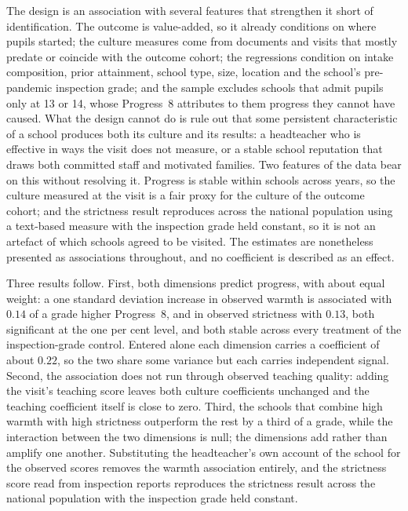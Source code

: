 The design is an association with several features that strengthen it short
of identification. The outcome is value-added, so it already conditions on
where pupils started; the culture measures come from documents and visits that
mostly predate or coincide with the outcome cohort; the regressions condition
on intake composition, prior attainment, school type, size, location and the
school's pre-pandemic inspection grade; and the sample excludes schools that
admit pupils only at 13 or 14, whose Progress~8 attributes to them progress
they cannot have caused. What the design cannot do is rule out that some
persistent characteristic of a school produces both its culture and its
results: a headteacher who is effective in ways the visit does not measure, or
a stable school reputation that draws both committed staff and motivated
families. Two features of the data bear on this without resolving it. Progress
is stable within schools across years, so the culture measured at the visit is
a fair proxy for the culture of the outcome cohort; and the strictness result
reproduces across the national population using a text-based measure with the
inspection grade held constant, so it is not an artefact of which schools
agreed to be visited. The estimates are nonetheless presented as associations
throughout, and no coefficient is described as an effect.

Three results follow. First, both dimensions predict progress, with about
equal weight: a one standard deviation increase in observed warmth is
associated with $0.14$ of a grade higher Progress~8, and in observed
strictness with $0.13$, both significant at the one per cent level, and both
stable across every treatment of the inspection-grade control. Entered alone
each dimension carries a coefficient of about $0.22$, so the two share some
variance but each carries independent signal. Second, the association does not
run through observed teaching quality: adding the visit's teaching score
leaves both culture coefficients unchanged and the teaching coefficient
itself is close to zero. Third, the schools that combine high warmth with high
strictness outperform the rest by a third of a grade, while the interaction
between the two dimensions is null; the dimensions add rather than amplify
one another. Substituting the headteacher's own account of the school for the
observed scores removes the warmth association entirely, and the strictness
score read from inspection reports reproduces the strictness result across
the national population with the inspection grade held constant.

